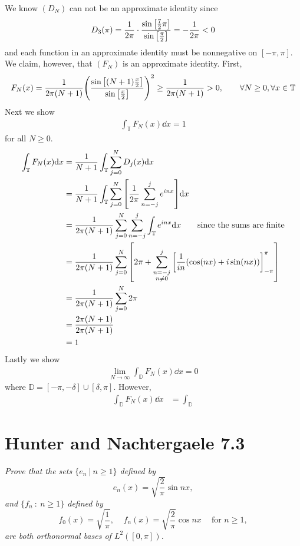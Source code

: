 \documentclass[12pt]{article}
\theoremstyle{plain}
\begin{document}
\begin{enumerate}[\bf (a)]
        We know $(D_N)$ can not be an approximate identity since $$D_3(\pi) = \frac{1}{2\pi}\cdot\frac{\sin\qty[\frac{7}{2}\pi]}{\sin\qty[\frac{\pi}{2}]} = -\frac{1}{2\pi} < 0$$ and each function in an approximate identity must be nonnegative on $[-\pi, \pi]$.  We claim, however, that $(F_N)$ is an approximate identity.  First,
        \begin{align*}
            F_N(x) = \frac{1}{2\pi(N+1)}\qty(\frac{\sin\qty[(N+1)\frac{x}{2}]}{\sin\qty[\frac{x}{2}]})^2 \geq \frac{1}{2\pi(N+1)} > 0,\ \ \ \ \ \ \forall N \geq 0, \forall x \in \mathbb{T}
        \end{align*}
        Next we show
        \begin{align*}
            \int_\mathbb{T} F_N(x)\dd x = 1
        \end{align*}
        for all $N \geq 0$.
        \begin{align*}
            \int_\mathbb{T} F_N(x)\dd x &= \frac{1}{N+1}\int_\mathbb{T}\sum_{j=0}^N D_j(x)\dd x \\
            &= \frac{1}{N+1}\int_\mathbb{T}\sum_{j=0}^N \qty[\frac{1}{2\pi}\sum_{n=-j}^j e^{inx}] \dd x \\
            &= \frac{1}{2\pi(N+1)}\sum_{j=0}^N\sum_{n=-j}^j\int_\mathbb{T} e^{inx} \dd x\ \ \ \ \ \ \text{since the sums are finite} \\
            &= \frac{1}{2\pi(N+1)}\sum_{j=0}^N\qty[2\pi + \sum_{\substack{n=-j\\n\neq 0}}^j \qty[\dfrac{1}{in}\qty(\cos(nx) + i\sin(nx))]_{-\pi}^\pi] \\
            &= \frac{1}{2\pi(N+1)}\sum_{j=0}^N 2\pi \\
            &= \frac{2\pi(N+1)}{2\pi(N+1)} \\
            &= 1
        \end{align*}
        Lastly we show
        \begin{align*}
            \lim_{N\rightarrow \infty}\int_\mathbb{D}F_N(x) \dd x = 0
        \end{align*}
        where $\mathbb{D} = [-\pi, -\delta]\cup[\delta, \pi]$.  However,
        \begin{align*}
            \int_\mathbb{D}F_N(x) \dd x &= \int_\mathbb{D}
        \end{align*}
\end{enumerate}

\section*{Hunter and Nachtergaele 7.3}
\emph{Prove that the sets $\{e_n\ |\ n \geq 1\}$ defined by $$e_n(x) = \sqrt{\frac{2}{\pi}}\sin nx,$$ and $\{f_n\ :\ n \geq 1\}$ defined by $$f_0(x) = \sqrt{\frac{1}{\pi}},\ \ \ \ \ f_n(x) = \sqrt{\frac{2}{\pi}}\cos nx\ \ \ \ \text{ for } n \geq 1,$$ are both orthonormal bases of $L^2([0,\pi])$.} \\
\end{document}
